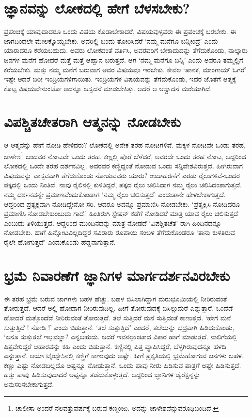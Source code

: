 \section*{ಜ್ಞಾನವನ್ನು ಲೋಕದಲ್ಲಿ ಹೇಗೆ ಬೆಳಸಬೇಕು?}

ಪ್ರಪಂಚಕ್ಕೆ ಯಾವುದಾದರೂ ಒಂದು ವಿಷಯ ಕೊಡಾಬೇಕಾದರೆ, ವಿಷಯವುಳ್ಳವರು ಈ ಪ್ರಪಂಚಕ್ಕೆ ಬರಬೇಕು. ಈ ಜಾಗದಿಂದಲೇ ಮೇಲಕ್ಕೊಯ್ಯಬೇಕು. ಅವರಿಲ್ಲಿ ಬಂದು ತೋರಿಸಿದರೆ `ನಮ್ಮ ಮನೆಗೂ ಬನ್ನೀಂದ್ರೆ' ಎಂದು ಯಾರಾದರೂ ಕರೆಯಬಹುದು. ಅವರು ಲೋಕದಂತೆ ವರ್ತಿಸಿ, ಅವರವರಿಗೆ ಬೇಕಾದುದನ್ನು ತೆಗೆದುಕೊಂಡು, ನಾಲ್ಕಾರು ಜನಗಳ ಮನೆಗೆ ಹೋದರೆ ಮತ್ತೆ ಮತ್ತೆ ಆಹ್ವಾನ ಬರುತ್ತದೆ. ಆಗ `ನಮ್ಮ ಮನೆಗೂ ಬನ್ನಿ' ಎಂದು ಅವರೂ ತಮ್ಮಲ್ಲಿಗೆ ಕರೆಯಬೇಕು. ಮತ್ತು ನಮ್ಮ ಮನೆಗೆ ಬರುವಾಗ ಅವರ ವಿಷಯವೂ ಇರಬೇಕು. ಕೇವಲ `ಪಾನಕ, ಮಾಂಗಾಯ್ ಓಗರೆ' ಇಷ್ಟೇ ಆದರೆ ಬರೀ ಇಂದ್ರಿಯಗಳಿಗಾಯಿತು. ಇಂದ್ರಿಯಗಳ ವಿಷಯವನ್ನು ತೆಗೆದುಕೊಂಡು, ಇದರ ಜೊತೆಗೆ ಆತ್ಮಕ್ಕೆ ಕೊಟ್ಟ ವಿಷಯವೇನುಂಟೋ ಅದನ್ನೂ ಆಸ್ವದನೆ ಮಾಡಬೇಕಿತ್ತು. ಆದರೆ ಆ ಆಸ್ವಾದನೆ ಮರೆಯಾಗಿದೆ.

\section*{ವಿಪಶ್ಚಿತಚೇತರಾಗಿ ಆತ್ಮನನ್ನು ನೋಡಬೇಕು}

ಆ ಆತ್ಮವನ್ನು ಹೇಗೆ ನೋಡಿ ಹೇಳಿದರು? ಲೋಕದಲ್ಲಿ ಅನೇಕ ತರಹ ನೋಟಗಳಿವೆ. ಮಕ್ಕಳ ನೋಟವೇ ಒಂಡು ತರಹ, ಚಾಳೇಶ\footnote{ಚಾಲೀಸಾ ಅಂದರೆ ನಲವತ್ತುವರ್ಷಕ್ಕೆ ಬರುವ ಕಣ್ಮಂಜು. ಅದನ್ನು ಚಾಳೇಶವೆನ್ನುವರೂಢಿಬಂದಿದೆ.} ಬಂದವರ ನೋಟವೇ ಒಂದು ತರಹ. ಕಣ್ಣಲ್ಲಿ ಪೊರೆ ಬೆಳೆದರೆ, ಅವರದೇ ಒಂದು ತರಹ ನೋಟ, ಆದ್ದರಿಂದ ಲೋಕದಲ್ಲಿ ಒಂದೇ ತರಹ ದರ್ಶನವಿಲ್ಲ. ಅವರವರ ಕಣ್ಣಿದ್ದಂತೆ ನೋಡುವ ಒಂದು ಸನ್ನಿವೇಶವಿರುತ್ತದೆ. ಹೀಗಿರುವಾಗ ವಿಷಯವನ್ನು ವಾಸ್ತವವಾಗಿ ತೆಗೆದುಕೊಂಡು ನೋಡುವವರು ಯಾರು? ಉದಾಹರಣೆಗೆ ಎರಡು ರೈಲುಗಳಿವೆ-ಒಂದರ ಪಕ್ಕದಲ್ಲಿ ಒಂದು ನಿಂತಿದೆ. ನಾವು ರೈಲಿನಲ್ಲಿ ಕುಳಿತಿದ್ದರೆ, ಪಕ್ಕದ ರೈಲು ಚಲಿಸಿದಾಗ ನಮ್ಮ ರೈಲು ಚಲಿಸಿದಂತಾಗುತ್ತದೆ. ನಮ್ಮ ದರ್ಶನವನ್ನೇ ಪ್ರಮಾಣವೆಂದುಕೊಂಡಾಗ `ನಮ್ಮ ರೈಲು ಚಲಿಸುತ್ತದೆ' ಎಂದುತಾನೇ ಹೇಳಬೇಕಾಗುತ್ತದೆ. ಆದ್ದರಿಂದ ಪ್ರತ್ಯಕ್ಷವಾಗಿ ನೋಡಿದ್ದೇನೋ ಸರಿ. ಆದರೂ ಅದನ್ನೂ ಪ್ರಮಾಣಿಸಿ ನೋಡಬೇಕು. `ಪ್ರತ್ಯಕ್ಷಿಸಿ ನೋಡಿದರೂ ಪ್ರಮಾಣಿಸಿ ನೋಡಬೇಕುಂಬುದು ಗಾದೆ.' ಹಿಂತಿರುಗಿ ಸ್ಟೇಷನ್ ಕಡೆಗೆ ನೋಡಿದರೆ ಮಾತ್ರ ಯಾವ ರೈಲು ಚಲಿಸುತ್ತದೆ ಎಂಬುದು ತಿಳಿಯುತ್ತದೆ. ಆದ್ದರಿಂದ ಮುಂದಿನದನ್ನು ಮಾತ್ರ ನೋಡದೆ `ವಿಪಶ್ಚಿತಚೆತ' ರಾಗಿ ಹಿಂದಿನದನ್ನೂ ನೋಡಬೇಕು. ಹಾಗೆ ಹಿನ್ನೋಟವಿಲ್ಲದಿದ್ದರೆ ಸವಿರಾರು ರೂಪಾಯಿ ಸಂಬಳ ತೆಗೆದುಕೊಂಡರೂ `ತಾನು ಕುಳಿತಿರುವ ರೈಲೇ ಹೋಗುತ್ತದೆ' ಎಂದುಕೊಂಡು ಹೆಡ್ಡನಾಗುತ್ತಾನೆ.

\section*{ಭ್ರಮೆ ನಿವಾರಣೆಗೆ ಜ್ಞಾನಿಗಳ ಮಾರ್ಗದರ್ಶನವಿರಬೇಕು}

ಈ ತರಹ ಭ್ರಮೆ ಬರುವ ಜಾಗಗಳು ಬಹಳ ಹೆಚ್ಚು. ಬಹಳ ಬಿಸಿಲಾಗಿದ್ದಾಗ ಮರುಭೂಮಿಯಲ್ಲಿ ನೀರಿರುವಂತೆ ತೋರುತ್ತದೆ. ಆದರೆ ಅಲ್ಲಿ ಹೋದಾಗ ನೀರಿರುವುದಿಲ್ಲ. ಹೀಗೆ ತೋರುವುದಕ್ಕೆ ಬಿಸಿಲ್ಗುದುರೆ ಎನ್ನುತ್ತಾರೆ. ಒಂದೆಡೆ ಹೋದರೆ ಮತ್ತೊಂದೆಡೆ ನೀರಿರುವಂತೆ ತೋರುತ್ತದೆ. ತಲೆ ಸುತ್ತಿದರೆ ಮನೆ ಸುತ್ತಿದಂತೆ ಕಾಣುತ್ತದೆ. `ಹೇಗೆ ಮನೆ ಸುತ್ತುತ್ತಿದೆ ! ನೋಡಿ !' ಎಂದು ಬಿಡುತ್ತಾನೆ. `ತಲೆ ಸುತ್ತುತ್ತಿದೆ' ಎಂದರೆ, ತಲೆಯನ್ನು ಭದ್ರವಾಗಿ ಹಿಡಿದುಕೊಂಡು, `ಏನೂ ಸುತ್ತುತ್ತಲೆ ಇಲ್ಲವಲ್ಲಾ? ಎನ್ನಬಹುದು. ಆದರೆ ಇವನಲ್ಲುಂಟಾದ ವಿಕಾರ ಹಾಗೆ ಮಾಡುತ್ತದೆ. ನಾಲಿಗೆಯಲ್ಲಿ ಪಿತ್ತವೇರಿದ್ದರೆ ಆಹಾರವನ್ನು ಕಹಿ ಎಂದು ಬಿಡುತ್ತಾನೆ. ಕಣ್ಣಿನಲ್ಲಿ ಪಿತ್ತ ವ್ಯಾಪಿಸಿದ್ದರೆ, ಬೆಳ್ಳಗಿರುವುದನ್ನೂ ಹಳದಿ ಎನ್ನುತ್ತಾನೆ. ಆಯಾ ಟೈಂಸ್ಪೇಸಿನಲ್ಲಿ ಕಣ್ಣಿಗೆ ಕಾಣುವುದು ಅಷ್ಟೇ. ಹೀಗೆ ಪ್ರಕೃತಿಯಲ್ಲಿ  ಭ್ರಮೆಹೋಗುವ ಜನಗಳು ಬಹಳ. ಕಣ್ಣು  ಎಷ್ಟು ನೋಡಬಲ್ಲದೊ ಅಷ್ಟನ್ನೂ ನೋಡುತ್ತಾನೆ. ಒಂದು ಪಾವು ನೀರು ಹಿಡಿಸುವ ಪಾತ್ರಗೆ ಅಷ್ಟೇ ಹಿಡಿಸುತ್ತದೆ. ಹತ್ತು ಪಾವು ಹಿಡಿಸುವುದಾದರೆ ಅಷ್ಟನ್ನೂ ತಡೆದುಕೊಳ್ಳುತ್ತದೆ. ಆದ್ದರಿಂದ ಜ್ಞಾನಿಗಳ ಡೈರೆಕ್ಷನ್ನನ್ನು ಅನುಸರಿಸಬೇಕಾಗುತ್ತದೆ.


